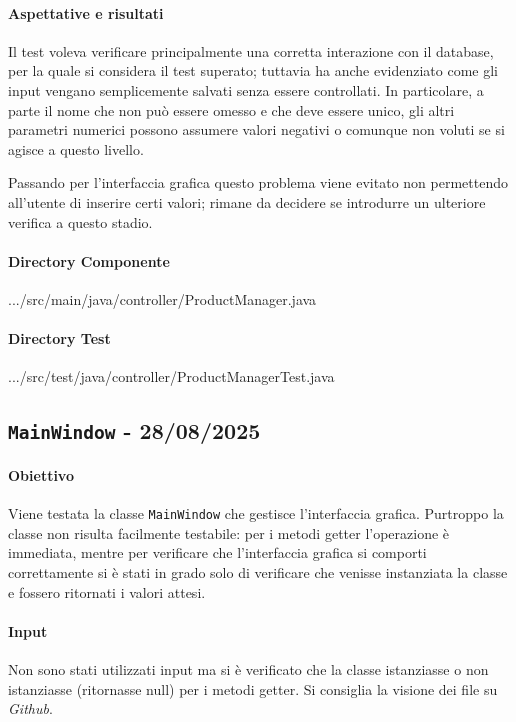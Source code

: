\documentclass{article}
\begin{document}
\paragraph{Aspettative e risultati}
Il test voleva verificare principalmente una corretta interazione con il database, per la quale si considera il test superato; tuttavia ha anche evidenziato come gli input vengano semplicemente salvati senza essere controllati. In particolare, a parte il nome che non può essere omesso e che deve essere unico, gli altri parametri numerici possono assumere valori negativi o comunque non voluti se si agisce a questo livello. 

Passando per l'interfaccia grafica questo problema viene evitato non permettendo all'utente di inserire certi valori; rimane da decidere se introdurre un ulteriore verifica a questo stadio. 

\paragraph{Directory Componente} 
\begin{code*}
    .../src/main/java/controller/ProductManager.java
\end{code*}
\paragraph{Directory Test} 
\begin{code*}
    .../src/test/java/controller/ProductManagerTest.java
\end{code*}

\subsection{\texttt{MainWindow} - 28/08/2025}
\paragraph{Obiettivo} Viene testata la classe \texttt{MainWindow} che gestisce l'interfaccia grafica. Purtroppo la classe non risulta facilmente testabile: per i metodi getter l'operazione è immediata, mentre per verificare che l'interfaccia grafica si comporti correttamente si è stati in grado solo di verificare che venisse instanziata la classe e fossero ritornati i valori attesi.  

\paragraph{Input} Non sono stati utilizzati input ma si è verificato che la classe istanziasse o non istanziasse (ritornasse null) per i metodi getter. Si consiglia la visione dei file su \textit{Github}. 
\end{document}
